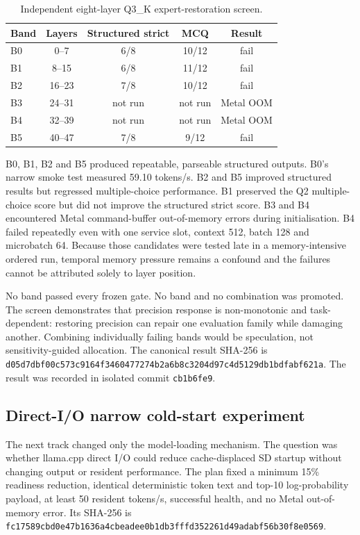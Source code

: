 \begin{table}[ht]
\centering
\small
\begin{tabular}{lcccc}
\toprule
Band & Layers & Structured strict & MCQ & Result \\
\midrule
B0 & 0--7   & 6/8 & 10/12 & fail \\
B1 & 8--15  & 6/8 & 11/12 & fail \\
B2 & 16--23 & 7/8 & 10/12 & fail \\
B3 & 24--31 & not run & not run & Metal OOM \\
B4 & 32--39 & not run & not run & Metal OOM \\
B5 & 40--47 & 7/8 & 9/12  & fail \\
\bottomrule
\end{tabular}
\caption{Independent eight-layer Q3\_K expert-restoration screen.}
\end{table}

B0, B1, B2 and B5 produced repeatable, parseable structured outputs.  B0's
narrow smoke test measured 59.10 tokens/s.  B2 and B5 improved structured
results but regressed multiple-choice performance.  B1 preserved the Q2
multiple-choice score but did not improve the structured strict score.  B3 and
B4 encountered Metal command-buffer out-of-memory errors during initialisation.
B4 failed repeatedly even with one service slot, context 512, batch 128 and
microbatch 64.  Because those candidates were tested late in a
memory-intensive ordered run, temporal memory pressure remains a confound and
the failures cannot be attributed solely to layer position.

No band passed every frozen gate.  No band and no combination was promoted.
The screen demonstrates that precision response is non-monotonic and
task-dependent: restoring precision can repair one evaluation family while
damaging another.  Combining individually failing bands would be speculation,
not sensitivity-guided allocation.  The canonical result SHA-256 is
\texttt{d05d7dbf00c573c9164f3460477274b2a6b8c3204d97c4d5129db1bdfabf621a}.
The result was recorded in isolated commit \texttt{cb1b6fe9}.

\subsection{Direct-I/O narrow cold-start experiment}

The next track changed only the model-loading mechanism.  The question was
whether llama.cpp direct I/O could reduce cache-displaced SD startup without
changing output or resident performance.  The plan fixed a minimum 15\%
readiness reduction, identical deterministic token text and top-10
log-probability payload, at least 50 resident tokens/s, successful health, and
no Metal out-of-memory error.  Its SHA-256 is
\texttt{fc17589cbd0e47b1636a4cbeadee0b1db3fffd352261d49adabf56b30f8e0569}.

